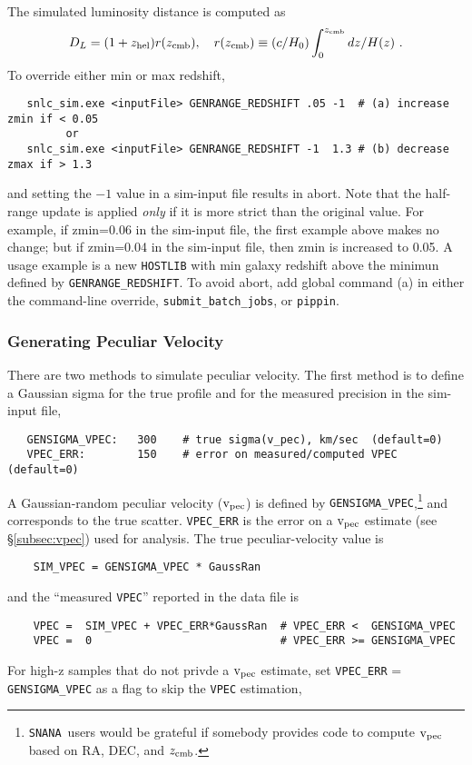 \documentclass[12pt]{article}
\newcommand{\snana}{{\tt SNANA}}
\newcommand{\zhelio}{z_{\rm hel}}
\newcommand{\zcmb}{z_{\rm cmb}}
\newcommand{\vpec}{{\rm v}_{\rm pec}}
\begin{document}
\medskip
The simulated luminosity distance is computed as 
\begin{equation}
  D_L = (1+\zhelio)r(\zcmb),~~~ 
     r(\zcmb) \equiv (c/H_0)\int_0^{\zcmb} dz/H(z)~.
\end{equation}
%
\medskip
To override either min or max redshift,
\vspace{-0.4cm}
\begin{verbatim}
   snlc_sim.exe <inputFile> GENRANGE_REDSHIFT .05 -1  # (a) increase zmin if < 0.05
         or
   snlc_sim.exe <inputFile> GENRANGE_REDSHIFT -1  1.3 # (b) decrease zmax if > 1.3
\end{verbatim}
\vspace{-0.2cm}
and setting the $-1$ value in a sim-input file results in abort.
Note that the half-range update is applied {\it only} if it is more strict
than the original value.
For example, if zmin=0.06 in the sim-input file, 
the first example above makes no change; 
but if zmin=0.04 in the sim-input file, then zmin is increased to 0.05.
A usage example is a new {\tt HOSTLIB} with min galaxy redshift above
the minimun defined by {\tt GENRANGE\_REDSHIFT}.
To avoid abort, add global command (a) in either the
command-line override, {\tt submit\_batch\_jobs}, or {\tt pippin}.

\clearpage 
\subsubsection{Generating Peculiar Velocity}
\label{sss:vpec}

There are two methods to simulate peculiar velocity.
The first method is to define a Gaussian sigma for
the true profile and for the measured precision in 
the sim-input file,
\begin{verbatim}
   GENSIGMA_VPEC:   300    # true sigma(v_pec), km/sec  (default=0)
   VPEC_ERR:        150    # error on measured/computed VPEC (default=0)
\end{verbatim}

A Gaussian-random peculiar velocity ($\vpec$) is defined by 
{\tt GENSIGMA\_VPEC},\footnote{\snana\ users would be grateful
  if somebody provides code to compute $\vpec$ based on
  RA, DEC, and $\zcmb$.}
and corresponds to the true scatter.
{\tt VPEC\_ERR} is the error on a $\vpec$ estimate 
(see \S\ref{subsec:vpec}) used for analysis.
The true peculiar-velocity value is 
\begin{verbatim} 
    SIM_VPEC = GENSIGMA_VPEC * GaussRan
\end{verbatim} 
and the ``measured {\tt VPEC}'' reported in the data file is
\begin{verbatim}
    VPEC =  SIM_VPEC + VPEC_ERR*GaussRan  # VPEC_ERR <  GENSIGMA_VPEC
    VPEC =  0                             # VPEC_ERR >= GENSIGMA_VPEC
\end{verbatim}
%
For high-z samples that do not privde a $\vpec$ estimate,
set {\tt VPEC\_ERR} = {\tt GENSIGMA\_VPEC} as a flag to
skip the {\tt VPEC} estimation,
\end{document}
